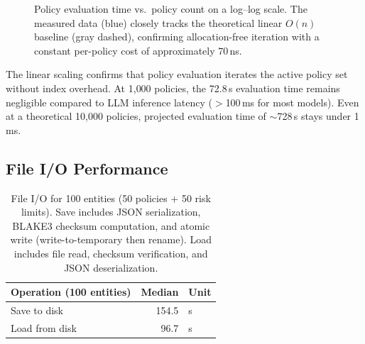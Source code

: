 \documentclass[10pt, twocolumn]{article}
\begin{document}
\begin{figure}[t]
\centering
{}
\caption{Policy evaluation time vs.\ policy count on a log--log scale. The measured data (blue) closely tracks the theoretical linear $O(n)$ baseline (gray dashed), confirming allocation-free iteration with a constant per-policy cost of approximately 70\,ns.}
\label{fig:scaling}
\end{figure}

The linear scaling confirms that policy evaluation iterates the active policy set without index overhead. At 1{,}000 policies, the 72.8\,\textmu{}s evaluation time remains negligible compared to LLM inference latency ($>$100\,ms for most models). Even at a theoretical 10{,}000 policies, projected evaluation time of $\sim$728\,\textmu{}s stays under 1\,ms.

\subsection{File I/O Performance}

\begin{table}[t]
\caption{File I/O for 100 entities (50 policies + 50 risk limits). Save includes JSON serialization, BLAKE3 checksum computation, and atomic write (write-to-temporary then rename). Load includes file read, checksum verification, and JSON deserialization.}
\label{tab:io}
\centering
\small
\begin{tabular}{@{}lrl@{}}
\toprule
\textbf{Operation (100 entities)} & \textbf{Median} & \textbf{Unit} \\
\midrule
Save to disk & 154.5 & \textmu{}s \\
Load from disk & 96.7 & \textmu{}s \\
\bottomrule
\end{tabular}
\end{table}
\end{document}
